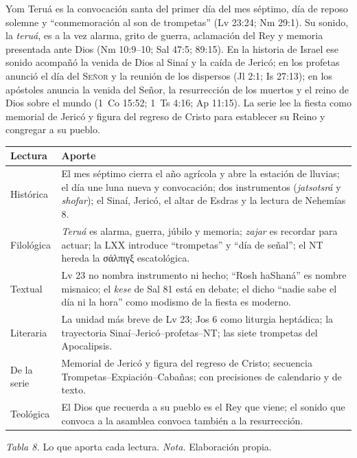 \documentclass[11pt,letterpaper]{article}
\newcommand{\grc}[1]{\foreignlanguage{ancientgreek}{#1}}
\newcommand{\SENOR}{\textsc{Señor}}
\begin{document}
\begin{tcolorbox}[enhanced,unbreakable,colback=papiro,colframe=tierraroja,boxrule=1pt,arc=3pt,title={Yom Teruá},fonttitle=\bfseries,colbacktitle=tierraroja,coltitle=papiro]
Yom Teruá es la convocación santa del primer día del mes séptimo, día de reposo solemne y ``conmemoración al son de trompetas'' (Lv 23:24; Nm 29:1). Su sonido, la \emph{teruá}, es a la vez alarma, grito de guerra, aclamación del Rey y memoria presentada ante Dios (Nm 10:9--10; Sal 47:5; 89:15). En la historia de Israel ese sonido acompañó la venida de Dios al Sinaí y la caída de Jericó; en los profetas anunció el día del \SENOR{} y la reunión de los dispersos (Jl 2:1; Is 27:13); en los apóstoles anuncia la venida del Señor, la resurrección de los muertos y el reino de Dios sobre el mundo (1~Co 15:52; 1~Ts 4:16; Ap 11:15). La serie lee la fiesta como memorial de Jericó y figura del regreso de Cristo para establecer su Reino y congregar a su pueblo.
\end{tcolorbox}

\begin{center}\begin{minipage}{\linewidth}\centering\small\renewcommand{\arraystretch}{1.18}
\begin{tabular}{@{}L{3.0cm}L{11.4cm}@{}}
\toprule
\textbf{Lectura} & \textbf{Aporte} \\ \midrule
Histórica & El mes séptimo cierra el año agrícola y abre la estación de lluvias; el día une luna nueva y convocación; dos instrumentos (\emph{jatsotsrá} y \emph{shofar}); el Sinaí, Jericó, el altar de Esdras y la lectura de Nehemías 8. \\
Filológica & \emph{Teruá} es alarma, guerra, júbilo y memoria; \emph{zajar} es recordar para actuar; la LXX introduce ``trompetas'' y ``día de señal''; el NT hereda la \grc{σάλπιγξ} escatológica. \\
Textual & Lv 23 no nombra instrumento ni hecho; ``Rosh haShaná'' es nombre misnaico; el \emph{kese} de Sal 81 está en debate; el dicho ``nadie sabe el día ni la hora'' como modismo de la fiesta es moderno. \\
Literaria & La unidad más breve de Lv 23; Jos 6 como liturgia heptádica; la trayectoria Sinaí--Jericó--profetas--NT; las siete trompetas del Apocalipsis. \\
De la serie & Memorial de Jericó y figura del regreso de Cristo; secuencia Trompetas--Expiación--Cabañas; con precisiones de calendario y de texto. \\
Teológica & El Dios que recuerda a su pueblo es el Rey que viene; el sonido que convoca a la asamblea convoca también a la resurrección. \\
\bottomrule
\end{tabular}\par
{\footnotesize\color{sepia}\textit{Tabla 8.} Lo que aporta cada lectura. \textit{Nota.} Elaboración propia.}
\end{minipage}\end{center}
\end{document}
